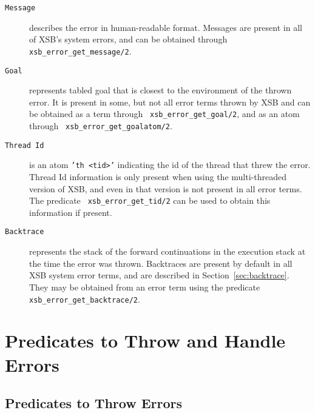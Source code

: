 \begin{description}

\item[{\tt Message}] describes the error in human-readable format.
  Messages are present in all of XSB's system errors, and can be
  obtained through {\tt xsb\_error\_get\_message/2}.

\item[{\tt Goal}] represents tabled goal that is closest to the
  environment of the thrown error.  It is present in some, but not all
  error terms thrown by XSB and can be obtained as a term through {\tt
    xsb\_error\_get\_goal/2}, and as an atom through {\tt
    xsb\_error\_get\_goalatom/2}.

\item[{\tt Thread Id}] is an atom {\tt 'th <tid>'} indicating the id
  of the thread that threw the error.  Thread Id information is only
  present when using the multi-threaded version of XSB, and even in
  that version is not present in all error terms.  The predicate {\tt
    xsb\_error\_get\_tid/2} can be used to obtain this information if
  present.

\item[{\tt Backtrace}] represents the stack of the forward
  continuations in the execution stack at the time the error was
  thrown.  Backtraces are present by default in all XSB system error
  terms, and are described in Section~\ref{sec:backtrace}.  They may be
  obtained from an error term using the predicate {\tt
    xsb\_error\_get\_backtrace/2}.

\end{description}

\section{Predicates to Throw and Handle Errors}
\label{sec:errorpredicates}

\subsection{Predicates to Throw Errors}

